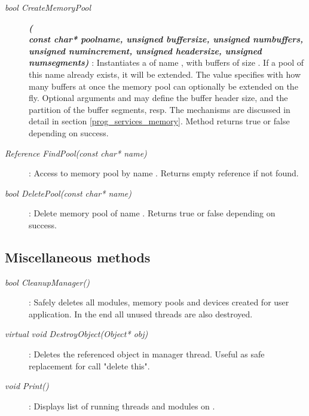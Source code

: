 \begin{description}	

\item[\em bool CreateMemoryPool] {\small \bf\em (} \\
{\small \bf\em const char* poolname, unsigned buffersize, unsigned numbuffers, \\
          unsigned numincrement, unsigned headersize, unsigned numsegments)} : 
Instantiates a  of name , 
with  buffers of size .
If a pool of this name already exists, it will be extended.
The  value specifies with how many buffers at once the memory pool 
can optionally be extended on the fly.
Optional arguments  and  may
define the buffer header size, and the partition of the buffer segments, resp.         
The  mechanisms are discussed in detail in 
section \ref{prog_services_memory}.
Method returns true or false depending on success.	

\item[\em Reference FindPool\small (const char* name)] :
Access to memory pool by name . Returns empty reference if not found.

\item[\em bool DeletePool\small (const char* name)] :
Delete memory pool of name . Returns true or false depending on success.
   
\end{description}
	 

\subsection{Miscellaneous methods}
	 
\begin{description}	
 
\item[\em bool CleanupManager\small () ] :
Safely deletes all modules, memory pools and devices created
for user application. In the end all unused threads are also 
destroyed. 
 
\item[\em virtual void DestroyObject\small (Object* obj)] :
Deletes the referenced object  in manager thread.
Useful as safe replacement for call "delete this".

\item[\em void Print()] :
Displays list of running threads and modules on .


\end{description}




